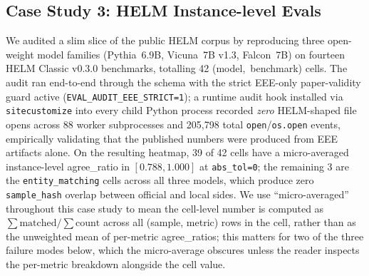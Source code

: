 \subsection{Case Study 3: HELM Instance-level Evals}
\label{sec:cs3-helm}

We audited a slim slice of the public HELM corpus by reproducing three
  open-weight model families (Pythia~6.9B, Vicuna~7B v1.3, Falcon~7B) on
  fourteen HELM Classic v0.3.0 benchmarks, totalling 42 \mbox{(model,
  benchmark)} cells.
The audit ran end-to-end through the \eee{} schema with the strict EEE-only
  paper-validity guard active (\texttt{EVAL\_AUDIT\_EEE\_STRICT=1}); a runtime
  audit hook installed via \texttt{sitecustomize} into every child Python
  process recorded \emph{zero} HELM-shaped file opens across 88 worker
  subprocesses and 205{,}798 total \texttt{open}/\texttt{os.open} events,
  empirically validating that the published numbers were produced from EEE
  artifacts alone.
On the resulting heatmap, 39 of 42 cells have a micro-averaged instance-level
  agree\_ratio in $[0.788, 1.000]$ at \texttt{abs\_tol=0}; the remaining 3 are
  the \texttt{entity\_matching} cells across all three models, which produce
  zero \texttt{sample\_hash} overlap between official and local sides.
We use ``micro-averaged'' throughout this case study to mean the cell-level
  number is computed as $\sum \text{matched} / \sum \text{count}$ across all
  (sample, metric) rows in the cell, rather than as the unweighted mean of
  per-metric agree\_ratios; this matters for two of the three failure modes
  below, which the micro-average obscures unless the reader inspects the
  per-metric breakdown alongside the cell value.


